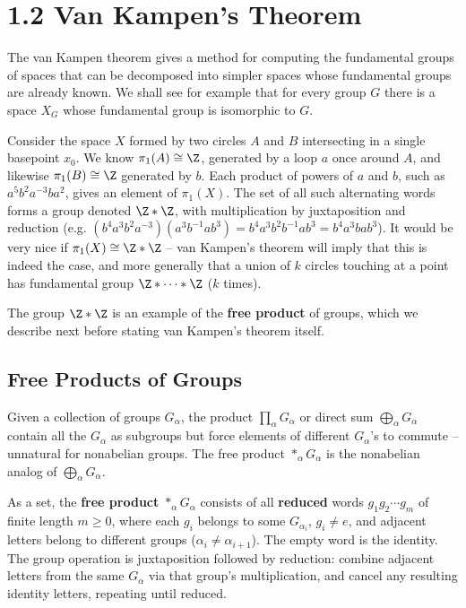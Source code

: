 \section{1.2 Van Kampen's Theorem}
\label{sec:van-kampen-theorem}

The van Kampen theorem gives a method for computing the fundamental groups
of spaces that can be decomposed into simpler spaces whose fundamental groups are
already known. We shall see for example that for every group $G$ there is a space
$X_G$ whose fundamental group is isomorphic to $G$.

Consider the space $X$ formed by two circles $A$ and $B$ intersecting in a single
basepoint $x_0$. We know $\pi_1(A) \cong \Z$, generated by a loop $a$ once around $A$,
and likewise $\pi_1(B) \cong \Z$ generated by $b$. Each product of powers of $a$ and $b$,
such as $a^5b^2a^{-3}ba^2$, gives an element of $\pi_1(X)$. The set of all such alternating
words forms a group denoted $\Z * \Z$, with multiplication by juxtaposition and
reduction (e.g. $(b^4a^3b^2a^{-3})(a^3b^{-1}ab^3) = b^4a^3b^2b^{-1}ab^3 = b^4a^3bab^3$). It would be very nice if
$\pi_1(X) \cong \Z * \Z$ -- van Kampen's theorem will imply that this is indeed the case,
and more generally that a union of $k$ circles touching at a point has fundamental
group $\Z * \cdots * \Z$ ($k$ times).



The group $\Z * \Z$ is an example of the \textbf{free product} of groups, which we
describe next before stating van Kampen's theorem itself.

\subsection*{Free Products of Groups}

Given a collection of groups $G_\alpha$, the product $\prod_\alpha G_\alpha$ or direct sum
$\bigoplus_\alpha G_\alpha$ contain all the $G_\alpha$ as subgroups but force elements of different
$G_\alpha$'s to commute -- unnatural for nonabelian groups. The free product
$*_\alpha G_\alpha$ is the nonabelian analog of $\bigoplus_\alpha G_\alpha$.

\begin{definition}
\label{def:free-product-of-groups}
As a set, the \textbf{free product} $*_\alpha G_\alpha$ consists of all \textbf{reduced} words
$g_1g_2\cdots g_m$ of finite length $m \ge 0$, where each $g_i$ belongs to some $G_{\alpha_i}$,
$g_i \ne e$, and adjacent letters belong to different groups ($\alpha_i \ne \alpha_{i+1}$). The empty
word is the identity. The group operation is juxtaposition followed by reduction:
combine adjacent letters from the same $G_\alpha$ via that group's multiplication, and
cancel any resulting identity letters, repeating until reduced.
\end{definition}


